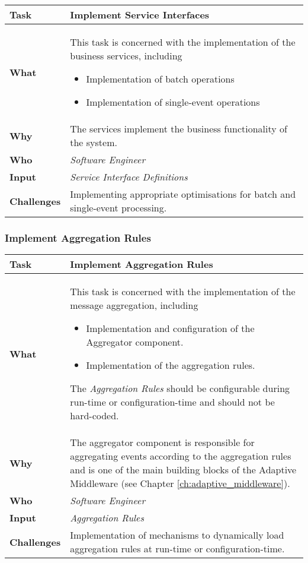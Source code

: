 \begin{tabularx}{\textwidth}{@{} l X @{}}
	\caption{Implement Service Interfaces} \label{table:ch6_Task_Implement_Service_Interfaces}\\
	\toprule 
	\bfseries Task & Implement Service Interfaces\\
	\midrule 
	\bfseries What & 
	This task is concerned with the implementation of the business services, including
	\begin{itemize}
		\item Implementation of batch operations
		\item Implementation of single-event operations
	\end{itemize}
	\\
	\midrule 
	\bfseries Why & The services implement the business functionality of the system.\\
	\midrule 
	\bfseries Who & \emph{Software Engineer}\\
	\midrule 
	\bfseries Input & \emph{Service Interface Definitions}\\
	\midrule 
	\bfseries Challenges & Implementing appropriate optimisations for batch and single-event processing.
	\\
	\bottomrule 
\end{tabularx}

\subsubsection{Implement Aggregation Rules}
\begin{tabularx}{\textwidth}{@{} l X @{}}
	\caption{Implement Aggregation Rules} \label{table:ch6_Task_Implement_Aggregator}\\
	\toprule 
	\bfseries Task & Implement Aggregation Rules\\
	\midrule 
	\bfseries What & 
	This task is concerned with the implementation of the message aggregation, including
	\begin{itemize}
		\item Implementation and configuration of the Aggregator component.
		\item Implementation of the aggregation rules.
	\end{itemize}
	The \emph{Aggregation Rules} should be configurable during run-time or configuration-time and should not be hard-coded.
	\\
	\midrule 
	\bfseries Why & The aggregator component is responsible for aggregating events according to the aggregation rules and is one of the main building blocks of the Adaptive Middleware (see Chapter \ref{ch:adaptive_middleware}).\\
	\midrule 
	\bfseries Who & \emph{Software Engineer}\\
	\midrule 
	\bfseries Input & \emph{Aggregation Rules}\\
	\midrule 
	\bfseries Challenges & Implementation of mechanisms to dynamically load aggregation rules at run-time or configuration-time.\\
	\bottomrule 
\end{tabularx}


